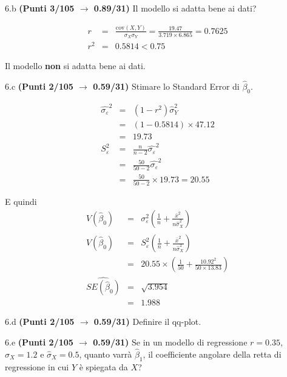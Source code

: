 \documentclass[
  11pt,
]{book}
\theoremstyle{mytheoremstyle}
\theoremstyle{mydefstyle}
\newenvironment{sol}
  {
  \begin{tcolorbox}[enhanced,breakable,arc=0.1mm,boxrule=1pt,colback=white,colframe=iblue,
  title=\bf \fontfamily{lmss}\selectfont \hspace{.5 cm} Soluzione,drop fuzzy shadow]

}{
\end{tcolorbox}
  }
\begin{document}
6.b \textbf{(Punti 3/105 \(\rightarrow\) 0.89/31)} Il modello si adatta bene ai dati?

\begin{sol}
\begin{eqnarray*}
r&=&\frac{\text{cov}(X,Y)}{\sigma_X\sigma_Y}=\frac{ 19.47 }{ 3.719 \times 6.865 }= 0.7625 \\ 
r^2&=& 0.5814 < 0.75
\end{eqnarray*}

Il modello \textbf{non} si adatta bene ai dati.

\end{sol}

6.c \textbf{(Punti 2/105 \(\rightarrow\) 0.59/31)} Stimare lo Standard Error di \(\hat\beta_0\).

\begin{sol}
\begin{eqnarray*}
\hat{\sigma_\varepsilon}^2&=&(1-r^2)\hat\sigma_Y^2\\
&=& (1- 0.5814 )\times 47.12 \\
   &=&  19.73 \\
   S_\varepsilon^2 &=& \frac{n} {n-2} \hat{\sigma_\varepsilon}^2\\
   &=&  \frac{ 50 } { 50 -2} \hat{\sigma_\varepsilon}^2 \\
 &=&  \frac{ 50 } { 50 -2} \times  19.73  =  20.55  
\end{eqnarray*}

E quindi\begin{eqnarray*}
V(\hat\beta_{0}) &=& \sigma_{\varepsilon}^{2} \left( \frac{1} {n}  +  \frac{\bar{x}^{2}} {n \hat{\sigma}^{2}_{X}} \right)\\
\widehat{V(\hat\beta_{0})} &=& S_{\varepsilon}^{2}\left( \frac{1} {n}  +  \frac{\bar{x}^{2}} {n \hat{\sigma}^{2}_{X}} \right)\ \\
 &=&  20.55 \times\left( \frac{1} { 50 }  +  \frac{ 10.92 ^{2}} { 50 \times  13.83 } \right)\\
 \widehat{SE(\hat\beta_{0})}        &=&  \sqrt{ 3.954 }\\
 &=&  1.988 
\end{eqnarray*}

\end{sol}

6.d \textbf{(Punti 2/105 \(\rightarrow\) 0.59/31)} Definire il qq-plot.

6.e \textbf{(Punti 2/105 \(\rightarrow\) 0.59/31)} Se in un modello di regressione \(r=0.35\), \(\hat\sigma_X=1.2\) e \(\hat\sigma_X=0.5\), quanto varrà
\(\hat\beta_1\), il coefficiente angolare della retta di regressione in cui \(Y\) è spiegata da \(X\)?
\end{document}

